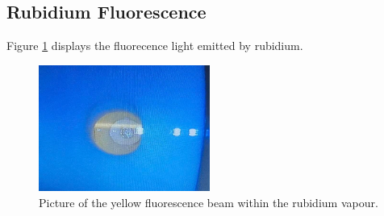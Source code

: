 \subsection{Rubidium Fluorescence}
Figure \ref{fig:fluorescence} displays the fluorecence light 
emitted by rubidium. 
\begin{figure}
    \centering
    \includegraphics[width=0.5\textwidth]{pictures/Strahl.jpeg}
    \caption{Picture of the yellow fluorescence beam within the rubidium vapour.}
    \label{fig:fluorescence}
\end{figure}

